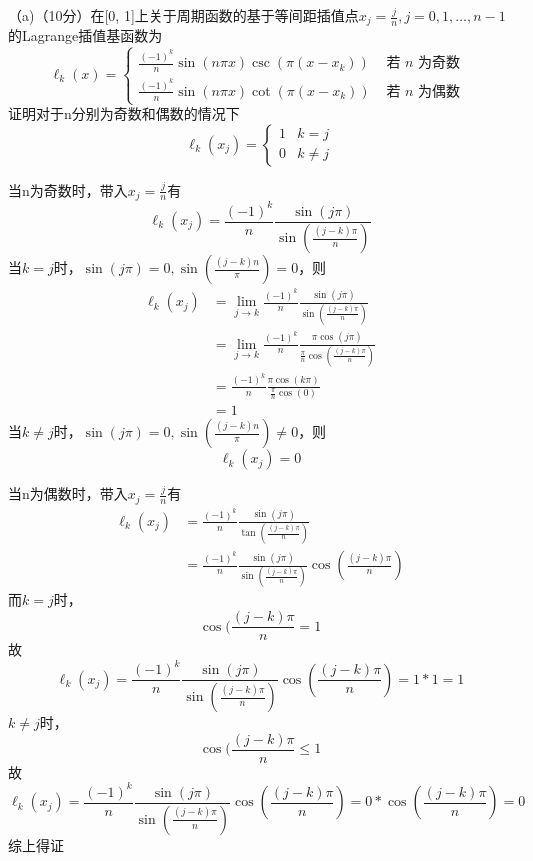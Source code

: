 \documentclass[12pt,a4paper,UTF8]{ctexart}
\begin{document}
\begin{enumerate}
	（a)（10分）在[0, 1]上关于周期函数的基于等间距插值点$x_j=\frac{j}{n},j=0,1,\dots,n-1$的Lagrange插值基函数为
                    $$
                        \ell_{k}(x)=\left\{\begin{array}{ll}
                            \frac{(-1)^{k}}{n} \sin (n \pi x) \csc \left(\pi\left(x-x_{k}\right)\right) & \text { 若 } n \text { 为奇数 } \\
                            \frac{(-1)^{k}}{n} \sin (n \pi x) \cot \left(\pi\left(x-x_{k}\right)\right) & \text { 若 } n \text { 为偶数 }
                        \end{array}\right.
                    $$
	证明对于n分别为奇数和偶数的情况下
                    $$
                        \ell_{k}\left(x_{j}\right)=\left\{\begin{array}{ll}
                            1 & k=j      \\
                            0 & k \neq j
                        \end{array}\right.
                    $$

	当n为奇数时，带入$x_j=\frac{j}{n}$有
	$$\ell_k(x_j)=\frac{(-1)^k}{n} \frac{\sin(j \pi)} {\sin(\frac {(j-k)\pi}{n})}$$
	当$k=j$时，$\sin (j\pi)=0,\sin(\frac {(j-k)n}{\pi})=0$，则
	$$
	\begin{aligned}
	\ell_k(x_j)&=\lim_{j \to k}\frac{(-1)^k}{n} \frac{\sin (j \pi)} {\sin(\frac {(j-k)\pi}{n})}\\
	&=\lim_{j \to k}\frac{(-1)^k}{n} \frac{\pi \cos(j\pi)} {\frac{\pi}{n}\cos(\frac {(j-k)\pi}{n})}\\
	&=\frac{(-1)^k}{n}\frac{\pi \cos(k\pi)}{\frac{\pi}{n}\cos(0)}\\
	&=1
	\end{aligned}
	$$
	当$k\ne j$时，$\sin (j\pi)=0,\sin(\frac {(j-k)n}{\pi})\ne 0$，则
	$$\ell_k(x_j)=0$$

	
	当n为偶数时，带入$x_j=\frac{j}{n}$有
	$$
	\begin{aligned}
	\ell_k(x_j)&=\frac{(-1)^k}{n} \frac{\sin(j \pi)} {\tan(\frac {(j-k)\pi}{n})}\\
	&=\frac{(-1)^k}{n} \frac{\sin(j \pi)} {\sin(\frac {(j-k)\pi}{n})} \cos(\frac {(j-k)\pi}{n})
	\end{aligned}
	$$
	而$k=j$时，$$\cos(\frac {(j-k)\pi}{n}=1$$
	故$$\ell_k(x_j)=\frac{(-1)^k}{n} \frac{\sin(j \pi)} {\sin(\frac {(j-k)\pi}{n})} \cos(\frac {(j-k)\pi}{n})=1*1=1$$
	$k\ne j$时，$$\cos(\frac {(j-k)\pi}{n}\leq 1$$
	故$$\ell_k(x_j)=\frac{(-1)^k}{n} \frac{\sin(j \pi)} {\sin(\frac {(j-k)\pi}{n})} \cos(\frac {(j-k)\pi}{n})=0*\cos(\frac {(j-k)\pi}{n})=0$$
	综上得证\\


\end{enumerate}
\end{document}
